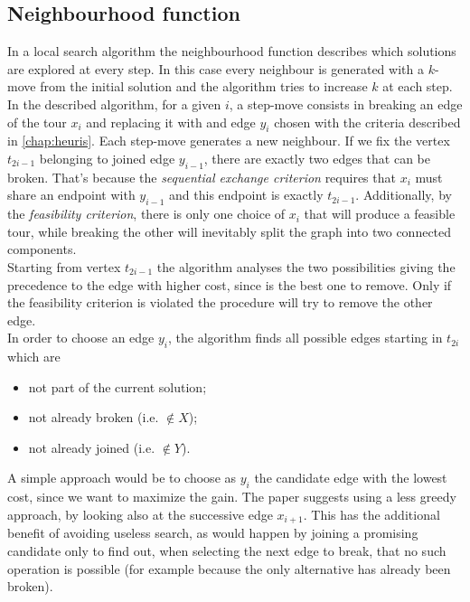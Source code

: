 \subsection{Neighbourhood function}
\label{ssec:neighbourhood}
In a local search algorithm the neighbourhood function describes which solutions are explored at every step. In this case every neighbour is generated with a $k$-move from the initial solution and the algorithm tries to increase $k$ at each step.\\
In the described algorithm, for a given $i$, a step-move consists in breaking an edge of the tour $x_i$ and replacing it with  and edge $y_i$ chosen with the criteria described in \cref{chap:heuris}. Each step-move generates a new neighbour.
If we fix the vertex $t_{2i-1}$ belonging to joined edge $y_{i-1}$, there are exactly two edges that can be broken. That's because the \emph{sequential exchange criterion} requires that $x_i$ must share an endpoint with $y_{i-1}$ and this endpoint is exactly $t_{2i-1}$. Additionally, by the \emph{feasibility criterion}, there is only one choice of $x_i$ that will produce a feasible tour, while breaking the other will inevitably split the graph into two connected components. \\
Starting from vertex $t_{2i-1}$ the algorithm analyses the two possibilities giving the precedence to the edge with higher cost, since is the best one to remove. Only if the feasibility criterion is violated the procedure will try to remove the other edge.\\
In order to choose an edge $y_i$, the algorithm finds all possible edges starting in $t_{2i}$ which are
\begin{itemize}
	\setlength\itemsep{0.05em}
	\item not part of the current solution;
	\item not already broken (i.e. $\notin X$);
	\item not already joined (i.e. $\notin Y$).
\end{itemize}
A simple approach would be to choose as $y_i$ the candidate edge with the lowest cost, since we want to maximize the gain. The paper suggests using a less greedy approach, by looking also at the successive edge $x_{i+1}$. This has the additional benefit of avoiding useless search, as would happen by joining a promising candidate only to find out, when selecting the next edge to break, that no such operation is possible (for example because the only alternative has already been broken). \\
